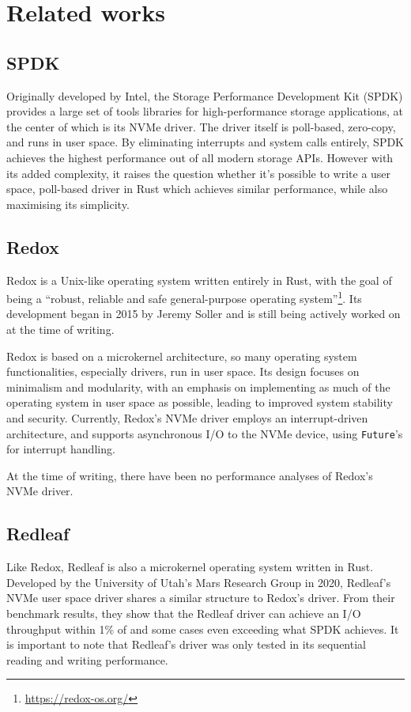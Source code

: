 \chapter{Related works}

\section{SPDK}
Originally developed by Intel, the Storage Performance Development Kit (SPDK) provides a large set of tools libraries for high-performance storage applications, at the center of which is its NVMe driver. The driver itself is poll-based, zero-copy, and runs in user space. By eliminating interrupts and system calls entirely, SPDK achieves the highest performance out of all modern storage APIs\cite{storage_api}. However with its added complexity, it raises the question whether it's possible to write a user space, poll-based driver in Rust which achieves similar performance, while also maximising its simplicity.


\section{Redox}
Redox is a Unix-like operating system written entirely in Rust, with the goal of being a ``robust, reliable and safe general-purpose operating system''\footnote{\url{https://redox-os.org/}}. Its development began in 2015 by Jeremy Soller and is still being actively worked on at the time of writing.

Redox is based on a microkernel architecture, so many operating system functionalities, especially drivers, run in user space. Its design focuses on minimalism and modularity, with an emphasis on implementing as much of the operating system in user space as possible, leading to improved system stability and security. Currently, Redox's NVMe driver employs an interrupt-driven architecture, and supports asynchronous I/O to the NVMe device, using \texttt{Future}'s for interrupt handling.

At the time of writing, there have been no performance analyses of Redox's NVMe driver.

\section{Redleaf}
Like Redox, Redleaf is also a microkernel operating system written in Rust. Developed by the University of Utah's Mars Research Group in 2020, Redleaf's NVMe user space driver shares a similar structure to Redox's driver. From their benchmark results, they show that the Redleaf driver can achieve an I/O throughput within 1\% of and some cases even exceeding what SPDK achieves\cite{redleaf}. It is important to note that Redleaf's driver was only tested in its sequential reading and writing performance.
